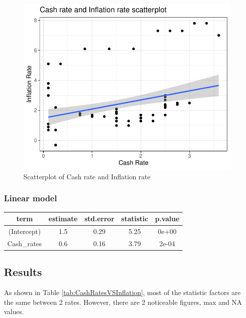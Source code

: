 \documentclass[11pt,a4paper,]{article}
\begin{document}
\begin{figure}[H]

{\centering \includegraphics{Inflation_Analysis_files/figure-latex/scatterplot-1} 

}

\caption{Scatterplot of Cash rate and Inflation rate}\label{fig:scatterplot}
\end{figure}

\hypertarget{linear-model}{%
\subsubsection{Linear model}\label{linear-model}}

\begin{tabular}{ccccc}
\toprule
term & estimate & std.error & statistic & p.value\\
\midrule
(Intercept) & 1.5 & 0.29 & 5.25 & 0e+00\\
Cash\_rates & 0.6 & 0.16 & 3.79 & 2e-04\\
\bottomrule
\end{tabular}

\hypertarget{results}{%
\subsection{Results}\label{results}}

As shown in Table \ref{tab:CashRatesVSInflation}, most of the statistic factors are the same between 2 rates. However, there are 2 noticeable figures, max and NA values.
\end{document}
